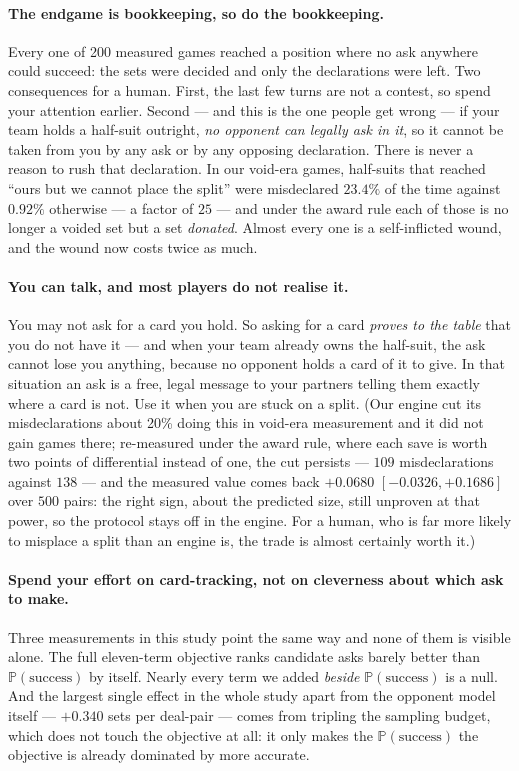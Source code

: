 \documentclass[11pt,a4paper]{article}
\newcommand{\Prob}{\ensuremath{\mathbb{P}}}
\begin{document}
\paragraph{The endgame is bookkeeping, so do the bookkeeping.} Every one of 200
measured games reached a position where no ask anywhere could succeed: the sets
were decided and only the declarations were left. Two consequences for a human.
First, the last few turns are not a contest, so spend your attention earlier.
Second --- and this is the one people get wrong --- if your team holds a half-suit
outright, \emph{no opponent can legally ask in it}, so it cannot be taken from
you by any ask or by any opposing declaration. There is never a reason to
rush that declaration. In our void-era games, half-suits that reached ``ours
but we cannot place the split'' were misdeclared $23.4\%$ of the time
against $0.92\%$ otherwise --- a factor of $25$ --- and under the award rule
each of those is no longer a voided set but a set \emph{donated}. Almost
every one is a self-inflicted wound, and the wound now costs twice as much.

\paragraph{You can talk, and most players do not realise it.} You may not ask
for a card you hold. So asking for a card \emph{proves to the table} that you do
not have it --- and when your team already owns the half-suit, the ask cannot
lose you anything, because no opponent holds a card of it to give. In that
situation an ask is a free, legal message to your partners telling them exactly
where a card is not. Use it when you are stuck on a split. (Our engine cut
its misdeclarations about 20\% doing this in void-era measurement and it did
not gain games there; re-measured under the award rule, where each save is
worth two points of differential instead of one, the cut persists --- $109$
misdeclarations against $138$ --- and the measured value comes back
$+0.0680$ $[-0.0326, +0.1686]$ over $500$ pairs: the right sign, about the
predicted size, still unproven at that power, so the protocol stays off in
the engine. For a human, who is far more likely to misplace a split than an
engine is, the trade is almost certainly worth it.)

\paragraph{Spend your effort on card-tracking, not on cleverness about which ask
to make.} Three measurements in this study point the same way and none of them
is visible alone. The full eleven-term objective ranks candidate asks barely
better than $\Prob(\text{success})$ by itself. Nearly every term we added
\emph{beside} $\Prob(\text{success})$ is a null. And the largest single effect in
the whole study apart from the opponent model itself --- $+0.340$ sets per
deal-pair --- comes from tripling the sampling budget, which does not touch the objective at all: it only makes the
$\Prob(\text{success})$ the objective is already dominated by more accurate.
\end{document}
